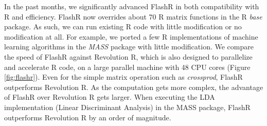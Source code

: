 \documentclass[simplex.tex]{subfiles}
\begin{document}
In the past months, we significantly advanced FlashR in both compatibility with R
and efficiency. FlashR now overrides about 70 R matrix functions in the R
\textit{base} package. As such, we can run existing R code with little
modification or no modification at all. For example, we ported a few R
implementations of machine learning algorithms in the \textit{MASS} package
with little modification. We compare the speed of FlashR against Revolution R,
which is also designed to parallelize and accelerate R code, on a large parallel
machine with 48 CPU cores (Figure \ref{fig:flashr}).
Even for the simple matrix operation such as \textit{crossprod}, FlashR
outperforms Revolution R. As the computation gets more complex, the advantage
of FlashR over Revolution R gets larger. When executing the LDA implementation
(Linear Discriminant Analysis) in the MASS package, FlashR outperforms Revolution R
by an order of magnitude.
\end{document}

